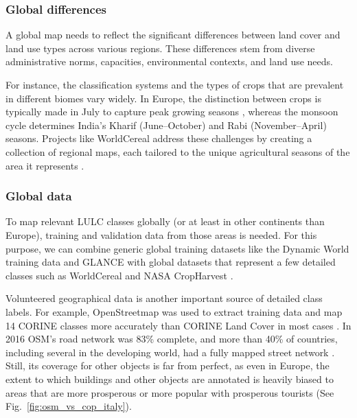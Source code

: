         \subsubsection{Global differences}
        
            A global map needs to reflect the significant differences between land cover and land use types across various regions. These differences stem from diverse administrative norms, capacities, environmental contexts, and land use needs. 
            
            For instance, the classification systems and the types of crops that are prevalent in different biomes vary widely. In Europe, the distinction between crops is typically made in July to capture peak growing seasons \citep{esch2014differentiation,xu2021towards}, whereas the monsoon cycle determines India's Kharif (June--October) and Rabi (November--April) seasons.
            Projects like WorldCereal address these challenges by creating a collection of regional maps, each tailored to the unique agricultural seasons of the area it represents \citep{tricht2023worldcereal}.
            
        \subsubsection{Global data}
            \label{syn:everywhere-globaldata}

            To map relevant LULC classes globally (or at least in other continents than Europe), training and validation data from those areas is needed. For this purpose, we can combine generic global training datasets like the Dynamic World training data \citep{tait2021dwtd} and GLANCE \citep{stanimirova2023global} with global datasets that represent a few detailed classes such as WorldCereal \citep{boogaard2023worldcereal} and NASA CropHarvest \citep{tseng2021cropharvest}. 
            
            Volunteered geographical data is another important source of detailed class labels. For example, OpenStreetmap was used to extract training data and map 14 CORINE classes more accurately than CORINE Land Cover in most cases \citep{schultz2017open}. In 2016 OSM's road network was 83\% complete, and more than 40\% of countries, including several in the developing world, had a fully mapped street network \citep{barrington2017world}. Still, its coverage for other objects is far from perfect, as even in Europe, the extent to which buildings and other objects are annotated is heavily biased to areas that are more prosperous or more popular with prosperous tourists (See Fig.\@~\ref{fig:osm_vs_cop_italy}).

